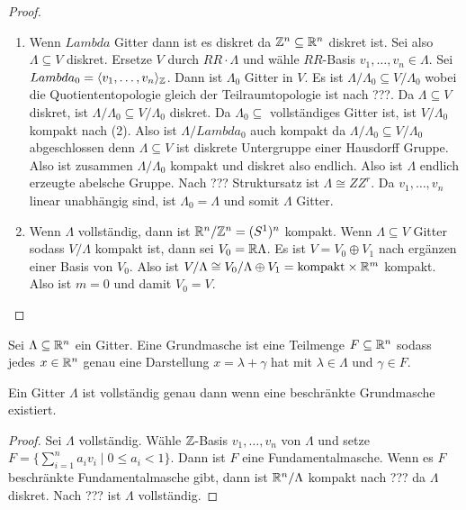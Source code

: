 \begin{proof}
	\begin{enumerate}
		\item Wenn \(Lambda\) Gitter dann ist es diskret da \(\mathbb{Z}^n\subseteq \mathbb{R}^n\) diskret ist.
		Sei also \(\Lambda\subseteq V\) diskret.
		Ersetze \(V\) durch \(RR\cdot \Lambda\) und wähle \(RR\)-Basis \(v_1,\dots,v_n\in \Lambda\).
		Sei \(Lambda_0=\langle v_1,\dots,v_n\rangle_{\mathbb{Z}}\).
		Dann ist \(\Lambda_0\) Gitter in \(V\).
		Es ist \(\Lambda/\Lambda_0\subseteq V/\Lambda_0\) wobei die Quotiententopologie gleich der Teilraumtopologie ist nach ???.
		Da \(\Lambda\subseteq V\) diskret, ist \(\Lambda/\Lambda_0\subseteq V/\Lambda_0\) diskret.
		Da \(\Lambda_0\subseteq\) vollständiges Gitter ist, ist \(V/\Lambda_0\) kompakt nach (2).
		Also ist \(\Lambda/Lambda_0\) auch kompakt da \(\Lambda/\Lambda_0\subseteq V/\Lambda_0\) abgeschlossen denn \(\Lambda\subseteq V\) ist diskrete Untergruppe einer Hausdorff Gruppe.
		Also ist zusammen \(\Lambda/\Lambda_0\) kompakt und diskret also endlich.
		Also ist \(\Lambda\) endlich erzeugte abelsche Gruppe.
		Nach ??? Struktursatz ist \(\Lambda\cong ZZ^r\). Da \(v_1,\dots,v_n\) linear unabhängig sind, ist \(\Lambda_0=\Lambda\) und somit \(\Lambda\) Gitter.
		\item Wenn \(\Lambda\) vollständig, dann ist \(\mathbb{R}^n/\mathbb{Z}^n=(S^1)^n\) kompakt.
		Wenn \(\Lambda\subseteq V\) Gitter sodass \(V/\Lambda\) kompakt ist, dann sei \(V_0=\mathbb{R}\Lambda\).
		Es ist \(V=V_0\oplus V_1\) nach ergänzen einer Basis von \(V_0\).
		Also ist \(V/\Lambda\cong V_0/\Lambda \oplus V_1=\text{kompakt}\times \mathbb{R}^m\) kompakt. Also ist \(m=0\) und damit \(V_0=V\).
	\end{enumerate}
\end{proof}
\begin{Def}
	Sei \(\Lambda\subseteq \mathbb{R}^n\) ein Gitter. Eine Grundmasche ist eine Teilmenge \(F\subseteq \mathbb{R}^n\)
	sodass jedes \(x\in\mathbb{R}^n\) genau eine Darstellung
	\(x=\lambda+\gamma\) hat mit \(\lambda\in \Lambda\) und \(\gamma\in F\).
\end{Def}
\begin{Lemma}
	Ein Gitter \(\Lambda\) ist vollständig genau dann wenn eine beschränkte Grundmasche existiert.
\end{Lemma}
\begin{proof}
	Sei \(\Lambda\) vollständig. Wähle \(\mathbb{Z}\)-Basis \(v_1,\dots,v_n\) von \(\Lambda\) und setze 
	\(F=\{\sum_{i=1}^na_iv_i\mid 0\leq a_i<1\}\). Dann ist \(F\) eine Fundamentalmasche.
	Wenn es \(F\) beschränkte Fundamentalmasche gibt, dann ist \(\mathbb{R}^n/\Lambda\) kompakt nach ??? da \(\Lambda\) diskret.
	Nach ??? ist \(\Lambda\) vollständig.
	
\end{proof}
